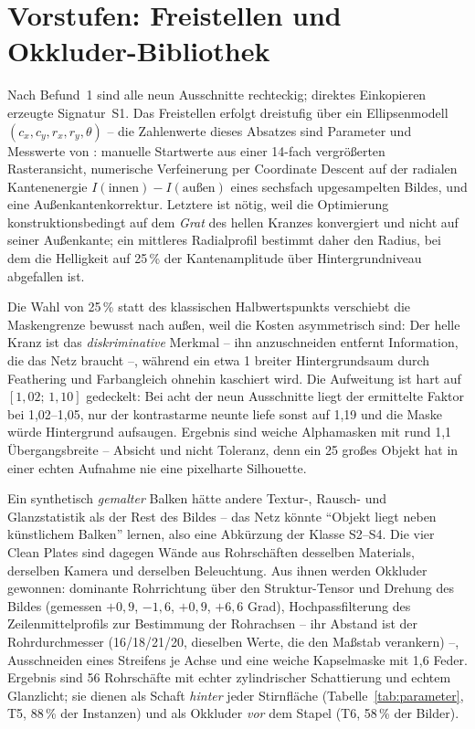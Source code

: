 \section{Vorstufen: Freistellen und Okkluder-Bibliothek}
\label{sec:matting}

 Nach Befund~1 sind alle neun Ausschnitte
rechteckig; direktes Einkopieren erzeugte Signatur~S1. Das Freistellen erfolgt
dreistufig über ein Ellipsenmodell $(c_x, c_y, r_x, r_y, \theta)$ -- die
Zahlenwerte dieses Absatzes sind Parameter und Messwerte von
: manuelle Startwerte aus einer 14-fach vergrößerten
Rasteransicht, numerische Verfeinerung
per Coordinate Descent auf der radialen Kantenenergie
$I(\text{innen}) - I(\text{außen})$ eines sechsfach upgesampelten Bildes, und
eine Außenkantenkorrektur. Letztere ist nötig, weil die Optimierung
konstruktionsbedingt auf dem \emph{Grat} des hellen Kranzes konvergiert und nicht
auf seiner Außenkante; ein mittleres Radialprofil bestimmt daher den Radius, bei
dem die Helligkeit auf 25\,\% der Kantenamplitude über Hintergrundniveau
abgefallen ist.

Die Wahl von 25\,\% statt des klassischen Halbwertspunkts
\parencite{gonzalez2018} verschiebt die Maskengrenze bewusst nach außen, weil die
Kosten asymmetrisch sind: Der helle Kranz ist das \emph{diskriminative} Merkmal
-- ihn anzuschneiden entfernt Information, die das Netz braucht --, während ein
etwa 1\px{} breiter Hintergrundsaum durch Feathering und Farbangleich ohnehin
kaschiert wird. Die Aufweitung ist hart auf $[1{,}02;\,1{,}10]$ gedeckelt: Bei
acht der neun Ausschnitte liegt der ermittelte Faktor bei 1,02--1,05, nur der
kontrastarme neunte liefe sonst auf 1,19 und die Maske würde Hintergrund
aufsaugen. Ergebnis sind weiche Alphamasken mit rund 1,1\px{} Übergangsbreite --
Absicht und nicht Toleranz, denn ein 25\px{} großes Objekt hat in einer echten
Aufnahme nie eine pixelharte Silhouette.

 Ein synthetisch \emph{gemalter} Balken hätte andere
Textur-, Rausch- und Glanzstatistik als der Rest des Bildes -- das Netz könnte
\enquote{Objekt liegt neben künstlichem Balken} lernen, also eine Abkürzung der
Klasse S2--S4. Die vier Clean Plates sind dagegen Wände aus Rohrschäften
desselben Materials, derselben Kamera und derselben Beleuchtung. Aus ihnen werden
Okkluder gewonnen: dominante Rohrrichtung über den Struktur-Tensor
\parencite{jaehne2005} und Drehung des Bildes (gemessen $+0{,}9$, $-1{,}6$,
$+0{,}9$, $+6{,}6$ Grad), Hochpassfilterung des Zeilenmittelprofils zur
Bestimmung der Rohrachsen -- ihr Abstand ist der Rohrdurchmesser
(16/18/21/20\px, dieselben Werte, die den Maßstab verankern) --, Ausschneiden
eines Streifens je Achse und eine weiche Kapselmaske mit 1,6\px{} Feder.
Ergebnis sind 56 Rohrschäfte mit echter zylindrischer Schattierung und echtem
Glanzlicht; sie dienen als Schaft \emph{hinter} jeder Stirnfläche
(Tabelle~\ref{tab:parameter}, T5, 88\,\% der Instanzen) und als Okkluder
\emph{vor} dem Stapel (T6, 58\,\% der Bilder).

